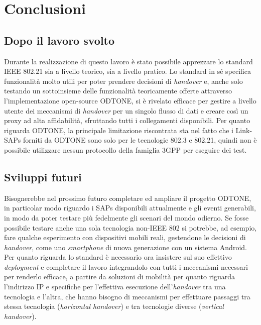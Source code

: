 \chapter{Conclusioni}

\section{Dopo il lavoro svolto}
Durante la realizzazione di questo lavoro è stato possibile apprezzare lo standard IEEE 802.21 sia a livello teorico, sia a livello pratico. Lo standard in sé specifica funzionalità molto utili per poter prendere decisioni di {\em handover} e, anche solo testando un sottoinsieme delle funzionalità teoricamente offerte attraverso l'implementazione open-source ODTONE, si è rivelato efficace per gestire a livello utente dei meccanismi di {\em handover} per un singolo flusso di dati e creare così un proxy ad alta affidabilità, sfruttando tutti i collegamenti disponibili. Per quanto riguarda ODTONE, la principale limitazione riscontrata sta nel fatto che i Link-SAPs forniti da ODTONE sono solo per le tecnologie 802.3 e 802.21, quindi non è possibile utilizzare nessun protocollo della famiglia 3GPP per eseguire dei test.

\section{Sviluppi futuri}
Bisognerebbe nel prossimo futuro completare ed ampliare il progetto ODTONE, in particolar modo riguardo i SAPs disponibili attualmente e gli eventi generabili, in modo da poter testare più fedelmente gli scenari del mondo odierno. Se fosse possibile testare anche una sola tecnologia non-IEEE 802 si potrebbe, ad esempio, fare qualche esperimento con dispositivi mobili reali, gestendone le decisioni di {\em handover}, come uno {\em smartphone} di nuova generazione con un sistema Android. Per quanto riguarda lo standard è necessario ora insistere sul suo effettivo {\em deployment} e completare il lavoro integrandolo con tutti i meccanismi necessari per renderlo efficace, a partire da soluzioni di mobilità per quanto riguarda l'indirizzo IP e specifiche per l'effettiva esecuzione dell'{\em handover} tra una tecnologia e l'altra, che hanno bisogno di meccanismi per effettuare passaggi tra stessa tecnologia ({\em horizontal handover}) e tra tecnologie diverse ({\em vertical handover}).